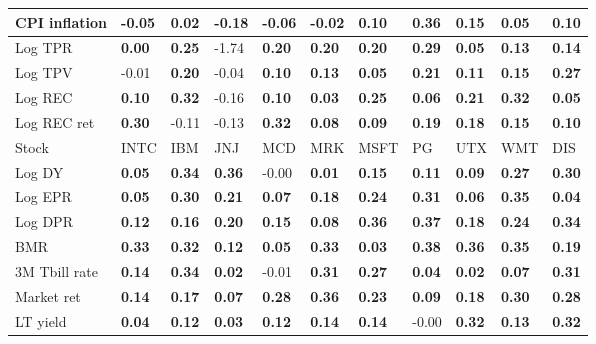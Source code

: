 \begin{table}[h!]
{\begin{center}
\begin{tabularx}{1\textwidth}{@{}X@{\hspace{0.25cm}}l@{\hspace{0.25cm}}l@{\hspace{0.25cm}}l@{\hspace{0.25cm}}l@{\hspace{0.25cm}}l@{\hspace{0.25cm}}l@{\hspace{0.25cm}}l@{\hspace{0.25cm}}l@{\hspace{0.25cm}}l@{\hspace{0.25cm}}l@{}}
 CPI inflation  & -0.05	 & \textbf{0.02}	 & -0.18	 & -0.06	 & -0.02	 & \textbf{0.10}	 & \textbf{0.36}	 & \textbf{0.15}	 & \textbf{0.05}	 & \textbf{0.10}	\\
\midrule
 Log TPR  & \textbf{0.00}	 & \textbf{0.25}	 & -1.74	 & \textbf{0.20}	 & \textbf{0.20}	 & \textbf{0.20}	 & \textbf{0.29}	 & \textbf{0.05}	 & \textbf{0.13}	 & \textbf{0.14}	\\
 Log TPV  & -0.01	 & \textbf{0.20}	 & -0.04	 & \textbf{0.10}	 & \textbf{0.13}	 & \textbf{0.05}	 & \textbf{0.21}	 & \textbf{0.11}	 & \textbf{0.15}	 & \textbf{0.27}	\\
 Log REC  & \textbf{0.10}	 & \textbf{0.32}	 & -0.16	 & \textbf{0.10}	 & \textbf{0.03}	 & \textbf{0.25}	 & \textbf{0.06}	 & \textbf{0.21}	 & \textbf{0.32}	 & \textbf{0.05}	\\
 Log REC ret  & \textbf{0.30}	 & -0.11	 & -0.13	 & \textbf{0.32}	 & \textbf{0.08}	 & \textbf{0.09}	 & \textbf{0.19}	 & \textbf{0.18}	 & \textbf{0.15}	 & \textbf{0.10}	\\
\midrule
\midrule
 Stock  & INTC	 & IBM	 & JNJ	 & MCD	 & MRK	 & MSFT	 & PG	 & UTX	 & WMT	 & DIS	\\
\midrule
 Log DY  & \textbf{0.05}	 & \textbf{0.34}	 & \textbf{0.36}	 & -0.00	 & \textbf{0.01}	 & \textbf{0.15}	 & \textbf{0.11}	 & \textbf{0.09}	 & \textbf{0.27}	 & \textbf{0.30}	\\
 Log EPR  & \textbf{0.05}	 & \textbf{0.30}	 & \textbf{0.21}	 & \textbf{0.07}	 & \textbf{0.18}	 & \textbf{0.24}	 & \textbf{0.31}	 & \textbf{0.06}	 & \textbf{0.35}	 & \textbf{0.04}	\\
 Log DPR  & \textbf{0.12}	 & \textbf{0.16}	 & \textbf{0.20}	 & \textbf{0.15}	 & \textbf{0.08}	 & \textbf{0.36}	 & \textbf{0.37}	 & \textbf{0.18}	 & \textbf{0.24}	 & \textbf{0.34}	\\
 BMR  & \textbf{0.33}	 & \textbf{0.32}	 & \textbf{0.12}	 & \textbf{0.05}	 & \textbf{0.33}	 & \textbf{0.03}	 & \textbf{0.38}	 & \textbf{0.36}	 & \textbf{0.35}	 & \textbf{0.19}	\\
\midrule
 3M Tbill rate  & \textbf{0.14}	 & \textbf{0.34}	 & \textbf{0.02}	 & -0.01	 & \textbf{0.31}	 & \textbf{0.27}	 & \textbf{0.04}	 & \textbf{0.02}	 & \textbf{0.07}	 & \textbf{0.31}	\\
 Market ret  & \textbf{0.14}	 & \textbf{0.17}	 & \textbf{0.07}	 & \textbf{0.28}	 & \textbf{0.36}	 & \textbf{0.23}	 & \textbf{0.09}	 & \textbf{0.18}	 & \textbf{0.30}	 & \textbf{0.28}	\\
 LT yield  & \textbf{0.04}	 & \textbf{0.12}	 & \textbf{0.03}	 & \textbf{0.12}	 & \textbf{0.14}	 & \textbf{0.14}	 & -0.00	 & \textbf{0.32}	 & \textbf{0.13}	 & \textbf{0.32}	\\

\end{tabularx}
\end{center}}
\end{table}
